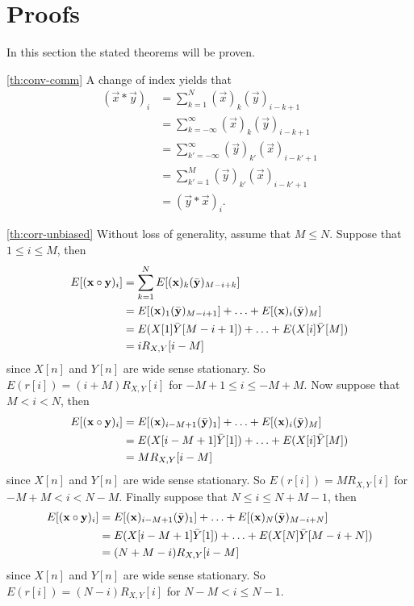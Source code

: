 \documentclass[a4paper, openany, oneside]{memoir}
\begin{document}
\section{Proofs}
\label{sec:proofs}
In this section the stated theorems will be proven.

\begin{blockProofTheorem}{\ref{th:conv-comm}}
    A change of index yields that
    \begin{align*}
        (\vec{x} \ast \vec{y})_i &= \sum_{k=1}^{N} (\vec{x})_k (\vec{y})_{i-k+1} \\
        &= \sum_{k=-\infty}^{\infty} (\vec{x})_k (\vec{y})_{i-k+1} \\
        &= \sum_{k'=-\infty}^{\infty} (\vec{y})_{k'} (\vec{x})_{i-k'+1} \\
        &= \sum_{k'=1}^{M} (\vec{y})_{k'} (\vec{x})_{i-k'+1} \\
        &= (\vec{y} \ast \vec{x})_i.
    \end{align*}
\end{blockProofTheorem}

\begin{blockProofTheorem}{\ref{th:corr-unbiased}}
    Without loss of generality, assume that $M \le N$. Suppose that $1 \le i \le M$, then
    \begin{align*}
        E[(\boldsymbol{\mathbf{x}} \circ \boldsymbol{\mathbf{y}})_i] &= \sum_{k=1}^N E[(\boldsymbol{\mathbf{x}})_k (\bar{\boldsymbol{\mathbf{y}}
        })_{M-i+k}] \\
        &= E[(\boldsymbol{\mathbf{x}})_1 (\bar{\boldsymbol{\mathbf{y}}})_{M-i+1}] + \ldots + E[(\boldsymbol{\mathbf{x}})_i (\bar{\boldsymbol{\mathbf{y}}})_{M}] \\
        &= E(X[1] \bar{Y}[M-i+1]) + \ldots + E(X[i] \bar{Y}[M])  \\
        &= i R_{X,Y}[i-M]
    \end{align*}
    since $X[n]$ and $Y[n]$ are wide sense stationary. So $E(r[i])=(i+M)R_{X,Y}[i]$ for $-M + 1\le i \le -M+M$. Now suppose that $M < i < N$, then
    \begin{align*}
        E[(\boldsymbol{\mathbf{x}} \circ \boldsymbol{\mathbf{y}})_i] &= E[(\boldsymbol{\mathbf{x}})_{i-M+1} (\bar{\boldsymbol{\mathbf{y}}})_{1}] + \ldots + E[(\boldsymbol{\mathbf{x}})_i (\bar{\boldsymbol{\mathbf{y}}})_{M}] \\
        &= E(X[i-M+1] \bar{Y}[1]) + \ldots + E(X[i] \bar{Y}[M]) \\  
        &= M R_{X,Y}[i-M]
    \end{align*}
    since $X[n]$ and $Y[n]$ are wide sense stationary. So $E(r[i])=M R_{X,Y}[i]$ for $-M+M<i<N-M$. Finally suppose that $N \le i \le N +M - 1$, then
    \begin{align*}
        E[(\boldsymbol{\mathbf{x}} \circ \boldsymbol{\mathbf{y}})_i] &= E[(\boldsymbol{\mathbf{x}})_{i-M+1} (\bar{\boldsymbol{\mathbf{y}}})_{1}] + \ldots + E[(\boldsymbol{\mathbf{x}})_N (\bar{\boldsymbol{\mathbf{y}}})_{M-i+N}] \\
        &= E(X[i-M+1] \bar{Y}[1]) + \ldots + E(X[N] \bar{Y}[M-i+N]) \\
        &= (N+M-i) R_{X,Y}[i-M]
    \end{align*}
    since $X[n]$ and $Y[n]$ are wide sense stationary. So $E(r[i])=(N-i)R_{X,Y}[i]$ for $N-M<i\le N-1$.
\end{blockProofTheorem}
\end{document}
